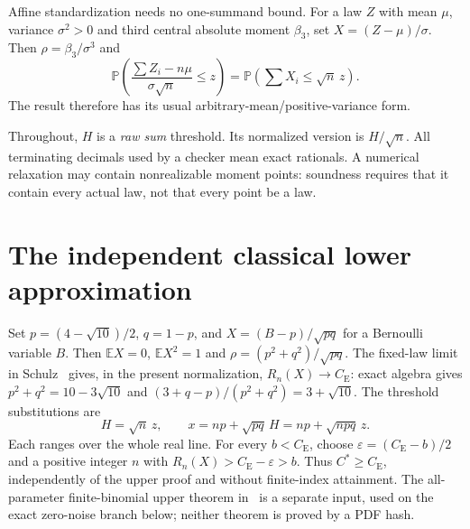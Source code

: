 \documentclass[11pt,a4paper]{article}
\newcommand{\E}{\mathbb E}
\newcommand{\Pp}{\mathbb P}
\newcommand{\CE}{C_{\mathrm E}}
\begin{document}
Affine standardization needs no one-summand bound. For a law $Z$ with mean
$\mu$, variance $\sigma^2>0$ and third central absolute moment $\beta_3$,
set $X=(Z-\mu)/\sigma$. Then $\rho=\beta_3/\sigma^3$ and
\[
 \Pp\!\left(\frac{\sum Z_i-n\mu}{\sigma\sqrt n}\le z\right)
 =\Pp\!\left(\sum X_i\le\sqrt n\,z\right).
\]
The result therefore has its usual arbitrary-mean/positive-variance form.

Throughout, \(H\) is a \emph{raw sum} threshold. Its normalized version is
\(H/\sqrt n\). All terminating decimals used by a checker mean exact
rationals. A numerical relaxation may contain nonrealizable moment points:
soundness requires that it contain every actual law, not that every point
be a law.

\section{The independent classical lower approximation}
Set $p=(4-\sqrt{10})/2$, $q=1-p$, and $X=(B-p)/\sqrt{pq}$ for a
Bernoulli variable $B$. Then $\E X=0$, $\E X^2=1$ and
$\rho=(p^2+q^2)/\sqrt{pq}$. The fixed-law limit in
Schulz~\cite[Remark~4.1, printed p.~15]{schulz} gives, in the present normalization,
$R_n(X)\to\CE$: exact algebra gives $p^2+q^2=10-3\sqrt{10}$ and
$(3+q-p)/(p^2+q^2)=3+\sqrt{10}$. The threshold substitutions are
\[
 H=\sqrt n\,z,\qquad x=np+\sqrt{pq}\,H=np+\sqrt{npq}\,z.
\]
Each ranges over the whole real line. For every $b<\CE$, choose
$\varepsilon=(\CE-b)/2$ and a positive integer $n$ with
$R_n(X)>\CE-\varepsilon>b$. Thus $C^*\ge\CE$, independently of the upper
proof and without finite-index attainment. The all-parameter finite-binomial
upper theorem in~\cite[Theorem~1]{schulz} is a separate input, used on the
exact zero-noise branch below; neither theorem is proved by a PDF hash.
\end{document}
